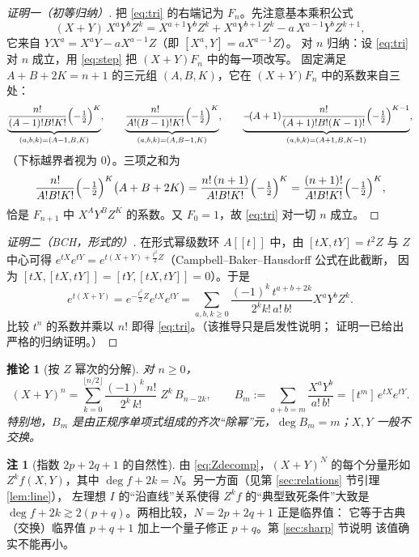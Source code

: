 \documentclass[11pt,UTF8]{ctexart}
\newtheorem{corollary}[theorem]{推论}
\theoremstyle{definition}
\newtheorem{remark}[theorem]{注}
\begin{document}
\begin{proof}[证明一（初等归纳）]
把 \eqref{eq:tri} 的右端记为 $F_n$。先注意基本乘积公式
\begin{equation}\label{eq:step}
(X+Y)\,X^{a}Y^{b}Z^{k}=X^{a+1}Y^{b}Z^{k}+X^{a}Y^{b+1}Z^{k}-a\,X^{a-1}Y^{b}Z^{k+1},
\end{equation}
它来自 $YX^{a}=X^{a}Y-aX^{a-1}Z$（即 $[X^a,Y]=aX^{a-1}Z$）。
对 $n$ 归纳：设 \eqref{eq:tri} 对 $n$ 成立，用 \eqref{eq:step} 把 $(X+Y)F_n$ 中的每一项改写。
固定满足 $A+B+2K=n+1$ 的三元组 $(A,B,K)$，它在 $(X+Y)F_n$ 中的系数来自三处：
\[
\underbrace{\frac{n!}{(A-1)!B!K!}\Bigl(-\tfrac12\Bigr)^{K}}_{(a,b,k)=(A-1,B,K)},\qquad
\underbrace{\frac{n!}{A!(B-1)!K!}\Bigl(-\tfrac12\Bigr)^{K}}_{(a,b,k)=(A,B-1,K)},\qquad
\underbrace{-\!(A+1)\frac{n!}{(A+1)!B!(K-1)!}\Bigl(-\tfrac12\Bigr)^{K-1}}_{(a,b,k)=(A+1,B,K-1)},
\]
（下标越界者视为 $0$）。三项之和为
\[
\frac{n!}{A!B!K!}\Bigl(-\tfrac12\Bigr)^{K}\bigl(A+B+2K\bigr)
=\frac{n!\,(n+1)}{A!B!K!}\Bigl(-\tfrac12\Bigr)^{K}
=\frac{(n+1)!}{A!B!K!}\Bigl(-\tfrac12\Bigr)^{K},
\]
恰是 $F_{n+1}$ 中 $X^AY^BZ^K$ 的系数。又 $F_0=1$，故 \eqref{eq:tri} 对一切 $n$ 成立。
\end{proof}

\begin{proof}[证明二（BCH，形式的）]
在形式幂级数环 $A[\![t]\!]$ 中，由 $[tX,tY]=t^2Z$ 与 $Z$ 中心可得
$e^{tX}e^{tY}=e^{t(X+Y)+\frac{t^2}{2}Z}$（Campbell--Baker--Hausdorff 公式在此截断，
因为 $[tX,[tX,tY]]=[tY,[tX,tY]]=0$）。于是
\[
e^{t(X+Y)}=e^{-\frac{t^2}{2}Z}e^{tX}e^{tY}
=\sum_{a,b,k\ge0}\frac{(-1)^k\,t^{a+b+2k}}{2^{k}k!\,a!\,b!}X^{a}Y^{b}Z^{k}.
\]
比较 $t^n$ 的系数并乘以 $n!$ 即得 \eqref{eq:tri}。（该推导只是启发性说明；
证明一已给出严格的归纳证明。）
\end{proof}

\begin{corollary}[按 $Z$ 幂次的分解]\label{cor:Zdecomp}
对 $n\ge0$，
\begin{equation}\label{eq:Zdecomp}
(X+Y)^{n}=\sum_{k=0}^{\lfloor n/2\rfloor}\frac{(-1)^{k}\,n!}{2^{k}\,k!}\;Z^{k}\,B_{n-2k},
\qquad
B_{m}:=\sum_{a+b=m}\frac{X^{a}Y^{b}}{a!\,b!}=[t^{m}]\,e^{tX}e^{tY}.
\end{equation}
特别地，$B_m$ 是由正规序单项式组成的齐次“除幂”元，$\deg B_m=m$；$X,Y$ 一般不交换。
\end{corollary}

\begin{remark}[指数 $2p+2q+1$ 的自然性]\label{rem:why}
由 \eqref{eq:Zdecomp}，$(X+Y)^{N}$ 的每个分量形如 $Z^k f(X,Y)$，其中
$\deg f+2k=N$。另一方面（见第 \ref{sec:relations} 节引理 \ref{lem:line}），
左理想 $I$ 的“沿直线”关系使得 $Z^{k}f$ 的“典型致死条件”大致是
$\deg f+2k\gtrsim 2(p+q)$。两相比较，$N=2p+2q+1$ 正是临界值：
它等于古典（交换）临界值 $p+q+1$ 加上一个量子修正 $p+q$。第 \ref{sec:sharp} 节说明
该值确实不能再小。
\end{remark}
\end{document}
